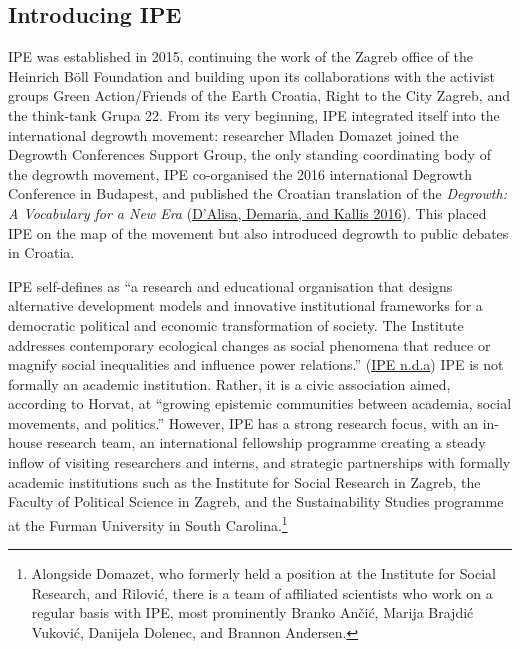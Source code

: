 \documentclass[a4paper, nobind]{templates/ociamthesis}
\begin{document}
\hypertarget{introducing-ipe}{%
\subsection{Introducing IPE}\label{introducing-ipe}}

IPE was established in 2015, continuing the work of the Zagreb office of the Heinrich Böll Foundation and building upon its collaborations with the activist groups Green Action/Friends of the Earth Croatia, Right to the City Zagreb, and the think-tank Grupa 22. From its very beginning, IPE integrated itself into the international degrowth movement: researcher Mladen Domazet joined the Degrowth Conferences Support Group, the only standing coordinating body of the degrowth movement, IPE co-organised the 2016 international Degrowth Conference in Budapest, and published the Croatian translation of the \emph{Degrowth: A Vocabulary for a New Era} (\protect\hyperlink{ref-dalisa_odrast_2016}{D'Alisa, Demaria, and Kallis 2016}). This placed IPE on the map of the movement but also introduced degrowth to public debates in Croatia.

IPE self-defines as ``a research and educational organisation that designs alternative development models and innovative institutional frameworks for a democratic political and economic transformation of society. The Institute addresses contemporary ecological changes as social phenomena that reduce or magnify social inequalities and influence power relations.'' (\protect\hyperlink{ref-ipe_ipe_}{IPE n.d.a}) IPE is not formally an academic institution. Rather, it is a civic association aimed, according to Horvat, at ``growing epistemic communities between academia, social movements, and politics.'' However, IPE has a strong research focus, with an in-house research team, an international fellowship programme creating a steady inflow of visiting researchers and interns, and strategic partnerships with formally academic institutions such as the Institute for Social Research in Zagreb, the Faculty of Political Science in Zagreb, and the Sustainability Studies programme at the Furman University in South Carolina.\footnote{Alongside Domazet, who formerly held a position at the Institute for Social Research, and Rilović, there is a team of affiliated scientists who work on a regular basis with IPE, most prominently Branko Ančić, Marija Brajdić Vuković, Danijela Dolenec, and Brannon Andersen.}
\end{document}
